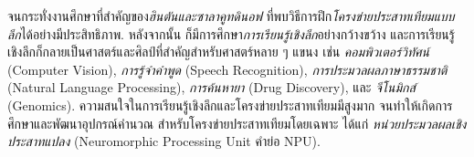 จนกระทั่งงานศึกษาที่สำคัญของ\textit{ฮินตันและซาลาคูทดินอฟ}\cite{HintonSalakhutdinov2006a} 
ที่พบวิธีการฝึก\textit{โครงข่ายประสาทเทียมแบบลึก}ได้อย่างมีประสิทธิภาพ.
หลังจากนั้น ก็มีการศึกษา\textit{การเรียนรู้เชิงลึก}อย่างกว้างขว้าง 
และการเรียนรู้เชิงลึกก็กลายเป็นศาสตร์และศิลป์ที่สำคัญสำหรับศาสตร์หลาย ๆ แขนง \cite{LeCunEtAl2015a, Jones2014a, Schmidhuber2015a,MNIST20150311,DahlSainathHinton2013a,DengEtAl2013a, 
ErhanEtAl2010a,CaetanoDosSantoEtAl2015,RamsundarEtAl2015,
ChenEtAl2014a,MaEtAl2015a,XiongEtAl2015a} เช่น \textit{คอมพิวเตอร์วิทัศน์} (Computer Vision), \textit{การรู้จำคำพูด} (Speech Recognition), \textit{การประมวลผลภาษาธรรมชาติ} (Natural Language Processing), \textit{การค้นหายา} (Drug Discovery), และ \textit{จีโนมิกส์} (Genomics).
ความสนใจในการเรียนรู้เชิงลึกและโครงข่ายประสาทเทียมมีสูงมาก จนทำให้เกิดการศึกษาและพัฒนาอุปกรณ์คำนวณ สำหรับโครงข่ายประสาทเทียมโดยเฉพาะ ได้แก่
\textit{หน่วยประมวลผลเชิงประสาทแปลง} (Neuromorphic Processing Unit\cite{MerollaEtAl2014a} คำย่อ NPU).





